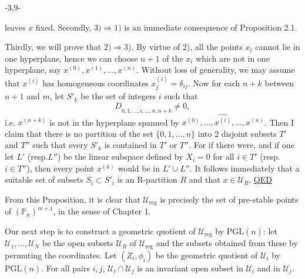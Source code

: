 \begin{center}-3.9-\end{center}
leaves $x$ fixed. Secondly, $3)\Rightarrow1)$ is an immediate consequence of Proposition 2.1.

Thirdly, we will prove that $2)\Rightarrow3)$. By virtue of 2), all the points $x_i$ cannot lie in one hyperplane, hence we can choose $n+1$ of the $x_i$ which are not in one hyperplane, say $x^{(0)},x^{(1)},\ldots,x^{(n)}$. Without loss of generality, we may assume that $x^{(i)}$ has homogeneous coordinates $x_j^{(i)}=\delta_{ij}$. Now for each $n+k$ between $n+1$ and $m$, let $S'_k$ be the set of integers $i$ such that
\[
D_{0,1,\ldots,\hat i,\ldots,n,n+k}\ne0,
\]
i.e. $x^{(n+k)}$ is not in the hyperplane spanned by $x^{(0)},\ldots,\widehat{x^{(i)}},\ldots,x^{(n)}$. Then I claim that there is no partition of the set $\{0,1,\ldots,n\}$ into 2 disjoint subsets $T'$ and $T''$ such that every $S'_k$ is contained in $T'$ or $T''$. For if there were, and if one let $L'$ (resp.$L''$) be the linear subspace defined by $X_i=0$ for all $i\in T'$ (resp. $i\in T''$), then every point $x^{(k)}$ would be in $L'\cup L''$. It follows immediately that a suitable set of subsets $S_i\subset S'_i$ is an R-partition $R$ and that $x\in\mathcal U_R$. \uline{QED}

From this Proposition, it is clear that $\mathcal U_{\mathrm{reg}}$ is precisely the set of pre-stable points of $(\mathbb P_n)^{m+1}$, in the sense of Chapter 1.

Our next step is to construct a geometric quotient of $\mathcal U_{\mathrm{reg}}$ by $\mathrm{PGL}(n)$: let $\mathcal U_1,\ldots,\mathcal U_N$ be the open subsets $\mathcal U_R$ of $\mathcal U_{\mathrm{reg}}$ and the subsets obtained from these by permuting the coordinates. Let $(Z_i,\phi_i)$ be the geometric quotient of $\mathcal U_i$ by $\mathrm{PGL}(n)$. For all pairs $i,j$, $\mathcal U_i\cap\mathcal U_j$ is an invariant open subset in $\mathcal U_i$ and in $\mathcal U_j$.
